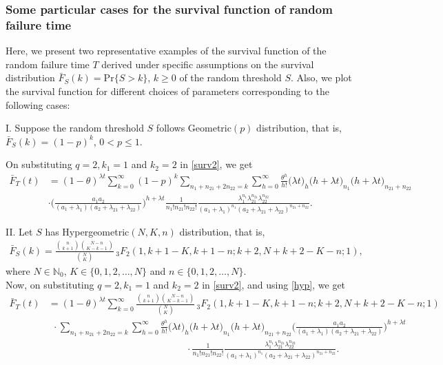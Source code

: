 \documentclass[12pt,oneside,reqno]{amsart}
\numberwithin{equation}{section}
\theoremstyle{definition}
\numberwithin{equation}{section}
\theoremstyle{remarkstyle}
\begin{document}
	
	
	
	
	




\subsubsection{Some particular cases for the survival function of random failure time}
Here, we present two representative examples of the survival function of the random failure time
 $T$ derived under specific assumptions on the survival distribution $\bar{F}_S(k)=\mathrm{Pr}\{S>k\}$, $k\ge 0$ of the random threshold $S$. Also, we plot the survival function for different choices of parameters corresponding to the following cases:

\noindent I.
 Suppose the random threshold $S$ follows Geometric$(p)$ distribution, that is, $\bar{F}_S(k)=(1-p)^k $, $0<p\le 1$.

On substituting $q=2, k_1=1$ and $k_2=2$ in \eqref{surv2}, we get
{\footnotesize \begin{align}\label{Geo}
\bar{F}_T(t)&=(1-\theta)^{\lambda t}\sum_{k=0}^{\infty}(1-p)^k\sum_{n_1+n_{21}+2n_{22}=k}	\sum_{h=0}^{\infty}\frac{\theta^h}{h!}\big(\lambda t\big)_h \big(h+\lambda t\big)_{n_1}\big(h+\lambda t\big)_{n_{21}+n_{22}}\nonumber\\ 
&\cdot\Big(\frac{a_1a_2}{(a_1+\lambda_1)(a_2+\lambda_{21}+\lambda_{22})}\Big)^{h+\lambda t}\frac{1}{n_1!n_{21}!n_{22}!} \frac{\lambda_1^{n_1}\lambda_{21}^{n_{21}} \lambda_{22}^{n_{22}}}{(a_1+\lambda_1)^{n_1}(a_2+\lambda_{21}+\lambda_{22})^{n_{21}+n_{22}}}.
\end{align}}




\noindent II. Let $S$ has Hypergeometric$(N,K,n)$ distribution, that is,
{\small \begin{align}\label{hyp}
		\bar{F}_S(k)=\frac{{n\choose k+1}{N-n \choose K-k-1}}{{N\choose K}}\,_3F_2(1, k+1-K, k+1-n; k+2, N+k+2-K-n; 1),
\end{align}}
where $N\in\mathbb{N}_0$, $K\in\{0,1,2,\dots,N\}$ and $n\in\{0,1,2,\dots,N\}$.\\
Now, on substituting $q=2, k_1=1$ and $k_2=2$ in \eqref{surv2}, and using \eqref{hyp}, we get
{\footnotesize \begin{align}\label{hypergeo}
		\bar{F}_T(t)&=(1-\theta)^{\lambda t}\sum_{k=0}^{\infty}\frac{{n\choose k+1}{N-n \choose K-k-1}}{{N\choose K}}\,_3F_2(1, k+1-K, k+1-n; k+2, N+k+2-K-n; 1)\nonumber\\
		&\ \ \cdot\sum_{n_1+n_{21}+2n_{22}=k}	\sum_{h=0}^{\infty}\frac{\theta^h}{h!}\big(\lambda t\big)_h \big(h+\lambda t\big)_{n_1}\big(h+\lambda t\big)_{n_{21}+n_{22}}\Big(\frac{a_1a_2}{(a_1+\lambda_1)(a_2+\lambda_{21}+\lambda_{22})}\Big)^{h+\lambda t}\nonumber\\ 
		&\hspace{6cm}\cdot\frac{1}{n_1!n_{21}!n_{22}!} \frac{\lambda_1^{n_1}\lambda_{21}^{n_{21}} \lambda_{22}^{n_{22}}}{(a_1+\lambda_1)^{n_1}(a_2+\lambda_{21}+\lambda_{22})^{n_{21}+n_{22}}}.
\end{align}}
\end{document}
